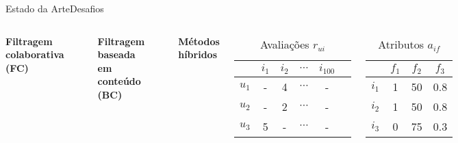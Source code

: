 \begin{frame}{Estado da Arte}{Desafios}
\begin{columns}[c]
\textbf{Filtragem colaborativa (FC)}



\par{~}


\textbf{Filtragem baseada em conteúdo (BC)}



\par{~}

\textbf{Métodos híbridos}



\begin{table}[h]
\begin{center}
    \caption{Avaliações $r_{ui}$}\vspace{-0.4cm}
    \begin{tabular}{ | c | c | c | c | c | c |} 
    \hline
     & $i_1$ & $i_2$ & $\cdots$ & $i_{100}$ \\ \hline
     $u_1$ & - & 4 & $\cdots$ & - \\ \hline
     $u_2$ & - & 2 & $\cdots$ & - \\ \hline
     $u_3$ & 5 & - & $\cdots$ & - \\ \hline
    \end{tabular}
\end{center}
\end{table}

\vspace{-.5cm}

\begin{table}[h]
\begin{center}
    \caption{Atributos $a_{if}$}
    \begin{tabular}{ | c | c | c | c | } 
    \hline
     & $f_1$ & $f_2$ & $f_3$ \\ \hline
     $i_1$ & 1 & 50 & 0.8 \\ \hline
     $i_2$ & 1 & 50 & 0.8 \\ \hline
     $i_3$ & 0 & 75 & 0.3 \\ \hline
    \end{tabular}
\end{center}
\end{table}

\end{columns}
\end{frame}

